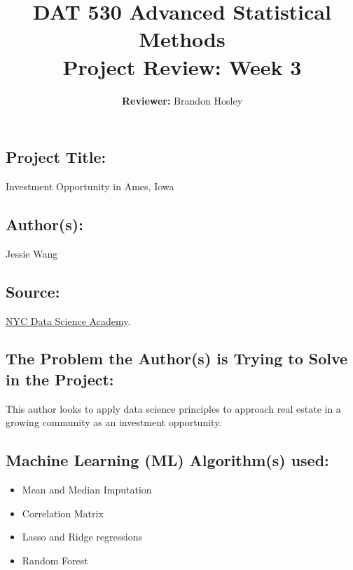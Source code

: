 \documentclass[]{article}
\title{\textbf{DAT 530 Advanced Statistical Methods}\\
	\normalsize{Project Review: Week 3} }
\author{\textbf{Reviewer: }
	Brandon Hosley}
\begin{document}
\setlength{\droptitle}{-10em} 
\pretitle{\begin{flushleft}\LARGE} %
	\posttitle{\end{flushleft}}
\preauthor{\begin{flushleft}\large} %
	\postauthor{\end{flushleft}}
\predate{\begin{flushleft}\large} %
	\postdate{\end{flushleft}}
\maketitle

\vspace{-2em}

\subsection*{Project Title:}
Investment Opportunity in Ames, Iowa

\subsection*{Author(s):}
Jessie Wang

\subsection*{Source:}
\href{https://nycdatascience.com/blog/student-works/investment-opportunity-in-ames-iowa/}{NYC Data Science Academy}.

\subsection*{The Problem the Author(s) is Trying to Solve in the Project:}
This author looks to apply data science principles to approach real estate in a growing community as an investment opportunity.

\subsection*{Machine Learning (ML) Algorithm(s) used:}
\begin{itemize}
	\item Mean and Median Imputation
	\item Correlation Matrix
	\item Lasso and Ridge regressions
	\item Random Forest
\end{itemize}
\end{document}
